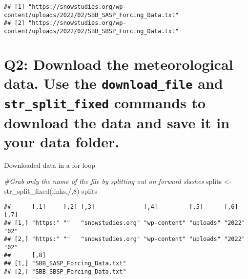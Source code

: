 \documentclass[
]{book}
\newenvironment{Shaded}{\begin{snugshade}}{\end{snugshade}}
\newcommand{\CommentTok}[1]{\textcolor[rgb]{0.56,0.35,0.01}{\textit{#1}}}
\newcommand{\DecValTok}[1]{\textcolor[rgb]{0.00,0.00,0.81}{#1}}
\newcommand{\FunctionTok}[1]{\textcolor[rgb]{0.00,0.00,0.00}{#1}}
\newcommand{\NormalTok}[1]{#1}
\newcommand{\OtherTok}[1]{\textcolor[rgb]{0.56,0.35,0.01}{#1}}
\newcommand{\StringTok}[1]{\textcolor[rgb]{0.31,0.60,0.02}{#1}}
\begin{document}
\begin{verbatim}
## [1] "https://snowstudies.org/wp-content/uploads/2022/02/SBB_SASP_Forcing_Data.txt"
## [2] "https://snowstudies.org/wp-content/uploads/2022/02/SBB_SBSP_Forcing_Data.txt"
\end{verbatim}

\hypertarget{q2-download-the-meteorological-data.-use-the-download_file-and-str_split_fixed-commands-to-download-the-data-and-save-it-in-your-data-folder.}{%
\section{\texorpdfstring{Q2: Download the meteorological data. Use the \texttt{download\_file} and \texttt{str\_split\_fixed} commands to download the data and save it in your data folder.}{Q2: Download the meteorological data. Use the download\_file and str\_split\_fixed commands to download the data and save it in your data folder.}}\label{q2-download-the-meteorological-data.-use-the-download_file-and-str_split_fixed-commands-to-download-the-data-and-save-it-in-your-data-folder.}}

Downloaded data in a for loop

\begin{Shaded}
\begin{Highlighting}[]
\CommentTok{\#Grab only the name of the file by splitting out on forward slashes}
\NormalTok{splits }\OtherTok{\textless{}{-}} \FunctionTok{str\_split\_fixed}\NormalTok{(links,}\StringTok{\textquotesingle{}/\textquotesingle{}}\NormalTok{,}\DecValTok{8}\NormalTok{)}
\NormalTok{splits}
\end{Highlighting}
\end{Shaded}

\begin{verbatim}
##      [,1]     [,2] [,3]              [,4]         [,5]      [,6]   [,7]
## [1,] "https:" ""   "snowstudies.org" "wp-content" "uploads" "2022" "02"
## [2,] "https:" ""   "snowstudies.org" "wp-content" "uploads" "2022" "02"
##      [,8]                       
## [1,] "SBB_SASP_Forcing_Data.txt"
## [2,] "SBB_SBSP_Forcing_Data.txt"
\end{verbatim}
\end{document}
